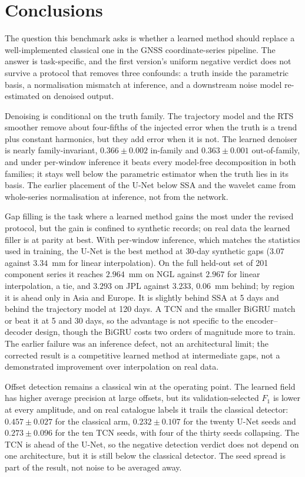 \section{Conclusions}
\label{sec:conclusion}

The question this benchmark asks is whether a learned method should replace a
well-implemented classical one in the GNSS coordinate-series pipeline. The
answer is task-specific, and the first version's uniform negative verdict does
not survive a protocol that removes three confounds: a truth inside the
parametric basis, a normalisation mismatch at inference, and a downstream noise
model re-estimated on denoised output.

Denoising is conditional on the truth family. The trajectory model and the RTS
smoother remove about four-fifths of the injected error when the truth is a
trend plus constant harmonics, but they add error when it is not. The learned
denoiser is nearly family-invariant, $0.366 \pm 0.002$ in-family and
$0.363 \pm 0.001$ out-of-family, and under per-window inference it beats every
model-free decomposition in both families; it stays well below the parametric
estimator when the truth lies in its basis. The earlier placement of the U-Net
below SSA and the wavelet came from whole-series normalisation at inference, not
from the network.

Gap filling is the task where a learned method gains the most under the
revised protocol, but the gain is confined to synthetic records; on real data
the learned filler is at parity at best. With per-window inference, which
matches the statistics used in
training, the U-Net is the best method at 30-day synthetic gaps ($3.07$ against
$3.34$~mm for linear interpolation). On the full held-out set of 201 component
series it reaches $2.964$~mm on NGL against $2.967$ for linear interpolation, a
tie, and $3.293$ on JPL against $3.233$, $0.06$~mm behind; by region it is
ahead only in Asia and Europe. It is slightly behind SSA at 5 days and behind
the trajectory model at 120 days. A TCN and the smaller BiGRU match or beat it
at 5 and 30 days, so the advantage is not specific to the encoder--decoder
design, though the BiGRU costs two orders of magnitude more to train. The
earlier failure was an inference defect, not an architectural limit; the
corrected result is a competitive learned method at intermediate gaps, not a
demonstrated improvement over interpolation on real data.

Offset detection remains a classical win at the operating point. The learned
field has higher average precision at large offsets, but its validation-selected
$F_1$ is lower at every amplitude, and on real catalogue labels it trails the
classical detector: $0.457 \pm 0.027$ for the classical arm, $0.232 \pm 0.107$
for the twenty U-Net seeds and $0.273 \pm 0.096$ for the ten TCN seeds, with
four of the thirty seeds collapsing. The TCN is ahead of the U-Net, so the
negative detection verdict does not depend on one architecture, but it is still
below the classical detector. The seed spread is part of the result, not noise
to be averaged away.

